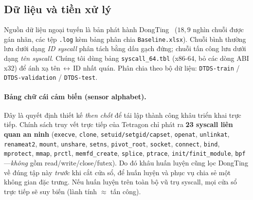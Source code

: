 \subsection{Dữ liệu và tiền xử lý}
Nguồn dữ liệu ngoại tuyến là bản phát hành DongTing~\cite{ref26_dongtingdataset}
($18{,}9$ nghìn chuỗi được gán nhãn, các tệp \texttt{.log} kèm bảng phân chia
\texttt{Baseline.xlsx}). Chuỗi bình thường lưu dưới dạng \emph{ID syscall} phân
tách bằng dấu gạch đứng; chuỗi tấn công lưu dưới dạng \emph{tên syscall}. Chúng
tôi dùng bảng \texttt{syscall\_64.tbl} (x86-64, bỏ các dòng ABI x32) để ánh xạ
tên\,$\leftrightarrow$\,ID nhất quán. Phân chia theo bộ dữ liệu:
\texttt{DTDS-train} / \texttt{DTDS-validation} / \texttt{DTDS-test}.

\paragraph{Bảng chữ cái cảm biến (sensor alphabet).} Đây là quyết định thiết kế
\emph{then chốt} để tái lập thành công khâu triển khai trực tiếp. Chính sách truy
vết trực tiếp của Tetragon chỉ phát ra \textbf{23 syscall liên quan an ninh}
(\texttt{execve}, \texttt{clone}, \texttt{setuid/setgid/capset}, \texttt{openat},
\texttt{unlinkat}, \texttt{renameat2}, \texttt{mount}, \texttt{unshare},
\texttt{setns}, \texttt{pivot\_root}, \texttt{socket}, \texttt{connect},
\texttt{bind}, \texttt{mprotect}, \texttt{mmap}, \texttt{prctl},
\texttt{memfd\_create}, \texttt{splice}, \texttt{ptrace},
\texttt{init/finit\_module}, \texttt{bpf}---\emph{không} gồm
read/write/close/futex). Do đó khâu huấn luyện cũng lọc DongTing về đúng tập này
\emph{trước} khi cắt cửa sổ, để huấn luyện và phục vụ chia sẻ một không gian đặc
trưng. Nếu huấn luyện trên toàn bộ vũ trụ syscall, mọi cửa sổ trực tiếp sẽ suy
biến (lành tính $\approx$ tấn công).

